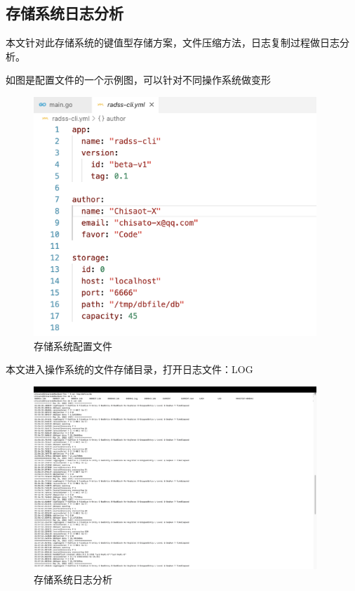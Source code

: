 	\subsection{存储系统日志分析}
	
	本文针对此存储系统的键值型存储方案，文件压缩方法，日志复制过程做日志分析。

	如图是配置文件的一个示例图，可以针对不同操作系统做变形
	\begin{figure}[H]
		\centering
		\includegraphics[width=0.95\textwidth]{images/radds_config.png}
		\caption{存储系统配置文件}
		\label{radds_config}
	\end{figure}

	本文进入操作系统的文件存储目录，打开日志文件：LOG

	\begin{figure}[H]
		\centering
		\includegraphics[width=0.95\textwidth]{images/radds_log.png}
		\caption{存储系统日志分析}
		\label{radds_log}
	\end{figure}

